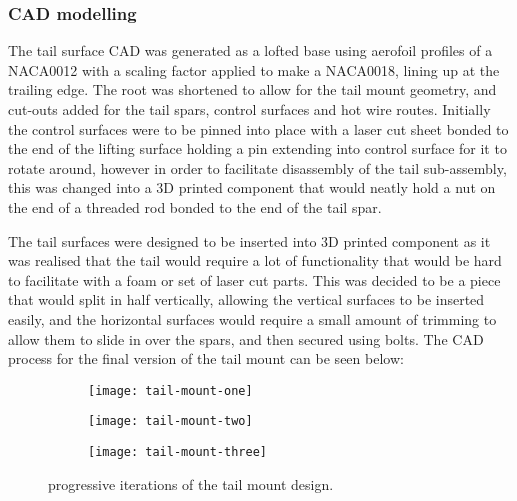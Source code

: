 \documentclass[../../main.tex]{subfiles}
\begin{document}
\subsubsection{CAD modelling} \label{sec:design-process:final-design-proposal:tail:cad-modelling}

The tail surface CAD was generated as a lofted base using aerofoil profiles of a NACA0012 with a scaling factor applied to make a NACA0018, lining up at the trailing edge.
The root was shortened to allow for the tail mount geometry, and cut-outs added for the tail spars, control surfaces and hot wire routes.
Initially the control surfaces were to be pinned into place with a laser cut sheet bonded to the end of the lifting surface holding a pin extending into control surface for it to rotate around, however in order to facilitate disassembly of the tail sub-assembly, this was changed into a 3D printed component that would neatly hold a nut on the end of a threaded rod bonded to the end of the tail spar.

The tail surfaces were designed to be inserted into 3D printed component as it was realised that the tail would require a lot of functionality that would be hard to facilitate with a foam or set of laser cut parts.
This was decided to be a piece that would split in half vertically, allowing the vertical surfaces to be inserted easily, and the horizontal surfaces would require a small amount of trimming to allow them to slide in over the spars, and then secured using bolts.
The CAD process for the final version of the tail mount can be seen below:


\begin{figure}[H]
    \centering
    \begin{subfigure}[b]{0.32\columnwidth}
        \centering
        \texttt{[image: tail-mount-one]}
        \caption{}
        \label{fig:tail-mount-progression:initial}
    \end{subfigure}
    \hfill
    \begin{subfigure}[b]{0.32\columnwidth}
        \centering
        \texttt{[image: tail-mount-two]}
        \caption{}
        \label{fig:tail-mount-progression:revised}
    \end{subfigure}
    \hfill
    \begin{subfigure}[b]{0.32\columnwidth}
        \centering
        \texttt{[image: tail-mount-three]}
        \caption{}
        \label{fig:tail-mount-progression:final}
    \end{subfigure}
    
    \caption{progressive iterations of the tail mount design.}
    \label{fig:tail-mount-progression}
\end{figure} 
\end{document}
